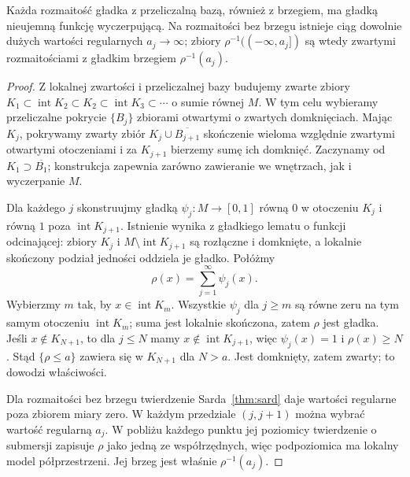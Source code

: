\begin{twierdzenie}
\label{thm:wyczerpanie-15}
Każda rozmaitość gładka z przeliczalną
bazą, również z brzegiem, ma gładką
nieujemną funkcję wyczerpującą.
Na rozmaitości bez brzegu istnieje
ciąg dowolnie dużych wartości regularnych
$a_j\to\infty$; zbiory
$\rho^{-1}((-\infty,a_j])$ są wtedy
zwartymi rozmaitościami z gładkim
brzegiem $\rho^{-1}(a_j)$.
\end{twierdzenie}
\begin{proof}
Z lokalnej zwartości i przeliczalnej
bazy budujemy zwarte zbiory
$K_1\subset\operatorname{int}K_2
\subset K_2\subset\operatorname{int}K_3
\subset\cdots$ o sumie równej $M$.
W tym celu wybieramy przeliczalne pokrycie
$\{B_j\}$ zbiorami otwartymi o zwartych domknięciach.
Mając $K_j$, pokrywamy zwarty zbiór
$K_j\cup\overline{B_{j+1}}$ skończenie wieloma
względnie zwartymi otwartymi otoczeniami i za
$K_{j+1}$ bierzemy sumę ich domknięć. Zaczynamy od
$K_1\supset\overline{B_1}$; konstrukcja zapewnia
zarówno zawieranie we wnętrzach, jak i wyczerpanie $M$.

Dla każdego $j$ skonstruujmy
gładką $\psi_j:M\to[0,1]$
równą $0$ w otoczeniu $K_j$
i równą $1$ poza
$\operatorname{int}K_{j+1}$.
Istnienie wynika z gładkiego
lematu o funkcji odcinającej:
zbiory $K_j$ i
$M\setminus\operatorname{int}K_{j+1}$
są rozłączne i domknięte, a
lokalnie skończony podział
jedności oddziela je gładko.
Połóżmy
\[
 \rho(x)=\sum_{j=1}^{\infty}\psi_j(x).
\]
Wybierzmy $m$ tak, by $x\in\operatorname{int}K_m$.
Wszystkie $\psi_j$ dla $j\geq m$ są równe zeru
na tym samym otoczeniu $\operatorname{int}K_m$;
suma jest lokalnie skończona,
zatem $\rho$ jest gładka.
Jeśli $x\notin K_{N+1}$,
to dla $j\leq N$ mamy
$x\notin\operatorname{int}K_{j+1}$,
więc $\psi_j(x)=1$ i $\rho(x)\geq N$.
Stąd $\{\rho\leq a\}$ zawiera się
w $K_{N+1}$ dla $N>a$.
Jest domknięty, zatem zwarty;
to dowodzi właściwości.

Dla rozmaitości bez brzegu
twierdzenie Sarda~\ref{thm:sard}
daje wartości regularne poza
zbiorem miary zero. W każdym
przedziale $(j,j+1)$ można
wybrać wartość regularną $a_j$.
W pobliżu każdego punktu jej
poziomicy twierdzenie o submersji
zapisuje $\rho$ jako jedną
ze współrzędnych, więc podpoziomica
ma lokalny model półprzestrzeni.
Jej brzeg jest właśnie
$\rho^{-1}(a_j)$.
\end{proof}

